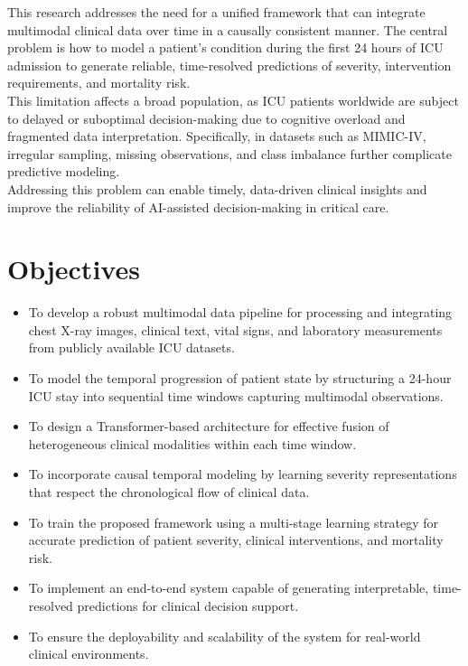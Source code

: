 \documentclass{fisatprojectfinal}
\begin{document}
This research addresses the need for a unified framework that can integrate multimodal clinical data over time in a causally consistent manner. The central problem is how to model a patient’s condition during the first 24 hours of ICU admission to generate reliable, time-resolved predictions of severity, intervention requirements, and mortality risk. \\

This limitation affects a broad population, as ICU patients worldwide are subject to delayed or suboptimal decision-making due to cognitive overload and fragmented data interpretation. Specifically, in datasets such as MIMIC-IV, irregular sampling, missing observations, and class imbalance further complicate predictive modeling. \\

Addressing this problem can enable timely, data-driven clinical insights and improve the reliability of AI-assisted decision-making in critical care.
\section{Objectives}
\begin{itemize}
    \item To develop a robust multimodal data pipeline for processing and integrating chest X-ray images, clinical text, vital signs, and laboratory measurements from publicly available ICU datasets.
    \item To model the temporal progression of patient state by structuring a 24-hour ICU stay into sequential time windows capturing multimodal observations.
    \item To design a Transformer-based architecture for effective fusion of heterogeneous clinical modalities within each time window.
    \item To incorporate causal temporal modeling by learning severity representations that respect the chronological flow of clinical data.
    \item To train the proposed framework using a multi-stage learning strategy for accurate prediction of patient severity, clinical interventions, and mortality risk.
    \item To implement an end-to-end system capable of generating interpretable, time-resolved predictions for clinical decision support.
    \item To ensure the deployability and scalability of the system for real-world clinical environments. 
\end{itemize} 
\end{document}
